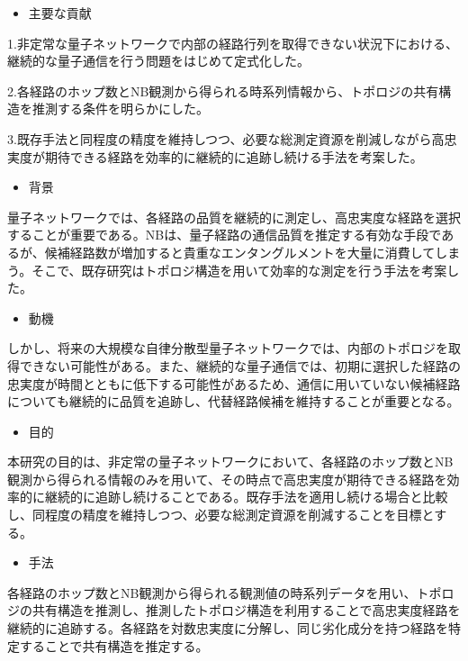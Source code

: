 \documentclass[conference]{IEEEtran}
\begin{document}
\begin{itemize}
\item 主要な貢献
\end{itemize}

1.非定常な量子ネットワークで内部の経路行列を取得できない状況下における、継続的な量子通信を行う問題をはじめて定式化した。

2.各経路のホップ数とNB観測から得られる時系列情報から、トポロジの共有構造を推測する条件を明らかにした。

3.既存手法と同程度の精度を維持しつつ、必要な総測定資源を削減しながら高忠実度が期待できる経路を効率的に継続的に追跡し続ける手法を考案した。



\begin{itemize}
\item 背景
\end{itemize}

量子ネットワークでは、各経路の品質を継続的に測定し、高忠実度な経路を選択することが重要である。NBは、量子経路の通信品質を推定する有効な手段であるが、候補経路数が増加すると貴重なエンタングルメントを大量に消費してしまう。そこで、既存研究はトポロジ構造を用いて効率的な測定を行う手法を考案した。

\begin{itemize}
\item 動機
\end{itemize}

しかし、将来の大規模な自律分散型量子ネットワークでは、内部のトポロジを取得できない可能性がある。また、継続的な量子通信では、初期に選択した経路の忠実度が時間とともに低下する可能性があるため、通信に用いていない候補経路についても継続的に品質を追跡し、代替経路候補を維持することが重要となる。

\begin{itemize}
\item 目的
\end{itemize}

本研究の目的は、非定常の量子ネットワークにおいて、各経路のホップ数とNB観測から得られる情報のみを用いて、その時点で高忠実度が期待できる経路を効率的に継続的に追跡し続けることである。既存手法を適用し続ける場合と比較し、同程度の精度を維持しつつ、必要な総測定資源を削減することを目標とする。

\begin{itemize}
\item 手法
\end{itemize}

各経路のホップ数とNB観測から得られる観測値の時系列データを用い、トポロジの共有構造を推測し、推測したトポロジ構造を利用することで高忠実度経路を継続的に追跡する。各経路を対数忠実度に分解し、同じ劣化成分を持つ経路を特定することで共有構造を推定する。
\end{document}
